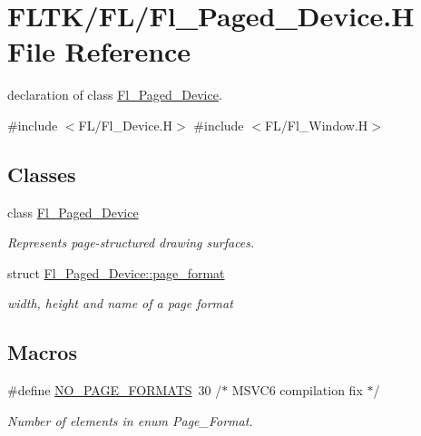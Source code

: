 \hypertarget{_fl___paged___device_8_h}{}\section{F\+L\+T\+K/\+F\+L/\+Fl\+\_\+\+Paged\+\_\+\+Device.H File Reference}
\label{_fl___paged___device_8_h}


declaration of class \hyperlink{class_fl___paged___device}{Fl\+\_\+\+Paged\+\_\+\+Device}.  


{\ttfamily \#include $<$F\+L/\+Fl\+\_\+\+Device.\+H$>$}\newline
{\ttfamily \#include $<$F\+L/\+Fl\+\_\+\+Window.\+H$>$}\newline
\subsection*{Classes}
\begin{DoxyCompactItemize}
\item 
class \hyperlink{class_fl___paged___device}{Fl\+\_\+\+Paged\+\_\+\+Device}
\begin{DoxyCompactList}\small\item\em Represents page-\/structured drawing surfaces. \end{DoxyCompactList}\item 
struct \hyperlink{struct_fl___paged___device_1_1page__format}{Fl\+\_\+\+Paged\+\_\+\+Device\+::page\+\_\+format}
\begin{DoxyCompactList}\small\item\em width, height and name of a page format \end{DoxyCompactList}\end{DoxyCompactItemize}
\subsection*{Macros}
\begin{DoxyCompactItemize}
\item 
\#define \hyperlink{_fl___paged___device_8_h_ad85fd91db75c56dcf6696635c1db0aff}{N\+O\+\_\+\+P\+A\+G\+E\+\_\+\+F\+O\+R\+M\+A\+TS}~30 /$\ast$ M\+S\+V\+C6 compilation fix $\ast$/
\begin{DoxyCompactList}\small\item\em Number of elements in enum Page\+\_\+\+Format. \end{DoxyCompactList}\end{DoxyCompactItemize}


